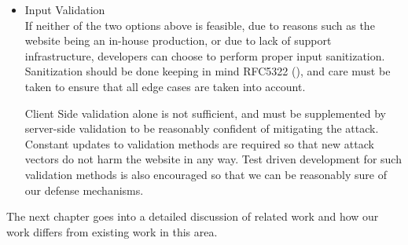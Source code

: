 \begin{itemize}
	\item Input Validation\\
	If neither of the two options above is feasible, due to reasons such as the website being an in-house production, or due to lack of support infrastructure, developers can choose to perform proper input sanitization. Sanitization should be done keeping in mind RFC5322 (\cite{rfc5322}), and care must be taken to ensure that all edge cases are taken into account.
	
	Client Side validation alone is not sufficient, and must be supplemented by server-side validation to be reasonably confident of mitigating the attack. Constant updates to validation methods are required so that new attack vectors do not harm the website in any way.
	Test driven development for such validation methods is also encouraged so that we can be reasonably sure of our defense mechanisms.
\end{itemize}

The next chapter goes into a detailed discussion of related work and how our work differs from existing work in this area.


